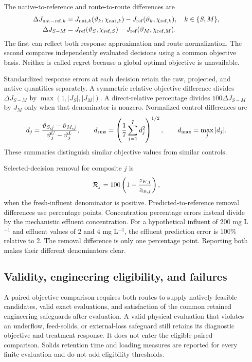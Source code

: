 The native-to-reference and route-to-route differences are
\begin{align}
\Delta J_{{\rm nat-ref},k}&=
J_{{\rm nat},k}(\vartheta_k,\chi_{{\rm nat},k})
-J_{\rm ref}(\vartheta_k,\chi_{{\rm ref},k}),\quad k\in\{S,M\},\\
\Delta J_{S-M}&=J_{\rm ref}(\vartheta_S,\chi_{{\rm ref},S})
-J_{\rm ref}(\vartheta_M,\chi_{{\rm ref},M}).
\label{eq:plant_objective_comparison}
\end{align}
The first can reflect both response approximation and route normalization. The second compares independently evaluated decisions using a common objective basis. Neither is called regret because a global optimal objective is unavailable.

Standardized response errors at each decision retain the raw, projected, and native quantities separately. A symmetric relative objective difference divides $\Delta J_{S-M}$ by $\max(1,|J_S|,|J_M|)$. A direct-relative percentage divides $100\Delta J_{S-M}$ by $J_M$ only when that denominator is nonzero. Normalized control differences are
\begin{equation}
d_j=\frac{\vartheta_{S,j}-\vartheta_{M,j}}{\vartheta_j^U-\vartheta_j^L},\qquad
d_{\rm rms}=\left(\frac17\sum_{j=1}^7d_j^2\right)^{1/2},\qquad
d_{\max}=\max_j|d_j|.
\end{equation}
These summaries distinguish similar objective values from similar controls.

Selected-decision removal for composite $j$ is
\begin{equation}
\mathcal R_j=100\left(1-\frac{z_{E,j}}{z_{{\rm in},j}}\right),
\end{equation}
when the fresh-influent denominator is positive. Predicted-to-reference removal differences use percentage points. Concentration percentage errors instead divide by the mechanistic effluent concentration. For a hypothetical influent of 200 mg L$^{-1}$ and effluent values of 2 and 4 mg L$^{-1}$, the effluent prediction error is 100\% relative to 2. The removal difference is only one percentage point. Reporting both makes their different denominators clear.

\subsection{Validity, engineering eligibility, and failures}

A paired objective comparison requires both routes to supply natively feasible candidates, valid exact evaluations, and satisfaction of the common retained engineering safeguards after evaluation. A valid physical evaluation that violates an underflow, feed-solids, or external-loss safeguard still retains its diagnostic objective and treatment response. It does not enter the eligible paired comparison. Solids retention time and loading measures are reported for every finite evaluation and do not add eligibility thresholds.

